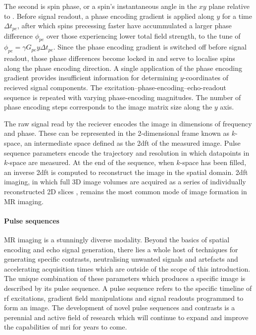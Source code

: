 The second is spin phase, or a spin's instantaneous angle in the $xy$ plane relative to .
Before signal readout, a phase encoding gradient is applied along $y$ for a time $\Delta t_{pe}$, after which spins precessing faster have accummulated a larger phase difference $\phi_{pe}$ over those experiencing lower total field strength, to the tune of $\phi_{pe}=\gamma G_{pe}y \Delta t_{pe}$.
Since the phase encoding gradient is switched off before signal readout, those phase differences become locked in and serve to localise spins along the phase encoding direction.
A single application of the phase encoding gradient provides insufficient information for determining $y$-coordinates of recieved signal components.
The excitation--phase-encoding--echo-readout sequence is repeated with varying phase-encoding magnitudes.
The number of phase encoding steps corresponds to the image matrix size along the $y$ axis.

The raw signal read by the reciever encodes the image in dimensions of frequency and phase.
These can be represented in the 2-dimensional frame known as $k$-space, an intermediate space defined as the \gls{2dft} of the measured image.
Pulse sequence parameters encode the trajectory and resolution in which datapoints in $k$-space are measured.
At the end of the sequence, when $k$-space has been filled, an inverse \gls{2dft} is computed to reconstruct the image in the spatial domain.
\Gls{2dft} imaging, in which full 3D image volumes are acquired as a series of individually reconstructed 2D slices , remains the most common  mode of image formation in MR imaging.

\paragraph{Pulse sequences}

MR imaging is a stunningly diverse modality.
Beyond the basics of spatial encoding and echo signal generation, there lies a whole host of techniques for generating specific contrasts, neutralising unwanted signals and artefacts and accelerating acquisition times which are outside of the scope of this introduction.
The unique combination of these  parameters which produces a specific image is described by its pulse sequence.
A pulse sequence refers to the specific timeline of \gls{rf} excitations, gradient field manipulations and signal readouts programmed to form an image.
The development of novel pulse sequences and contrasts is a perennial and active field of research which will continue to expand and improve the capabilities of \gls{mri} for years to come.

